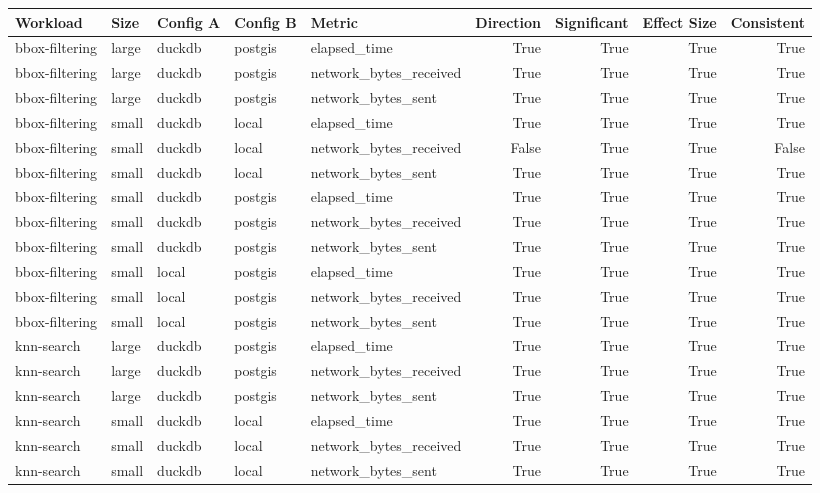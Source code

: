 \begin{tabular}{lllllrrrr}
\toprule
Workload & Size & Config A & Config B & Metric & Direction & Significant & Effect Size & Consistent \\
\midrule
bbox-filtering & large & duckdb & postgis & elapsed\_time & True & True & True & True \\
bbox-filtering & large & duckdb & postgis & network\_bytes\_received & True & True & True & True \\
bbox-filtering & large & duckdb & postgis & network\_bytes\_sent & True & True & True & True \\
bbox-filtering & small & duckdb & local & elapsed\_time & True & True & True & True \\
bbox-filtering & small & duckdb & local & network\_bytes\_received & False & True & True & False \\
bbox-filtering & small & duckdb & local & network\_bytes\_sent & True & True & True & True \\
bbox-filtering & small & duckdb & postgis & elapsed\_time & True & True & True & True \\
bbox-filtering & small & duckdb & postgis & network\_bytes\_received & True & True & True & True \\
bbox-filtering & small & duckdb & postgis & network\_bytes\_sent & True & True & True & True \\
bbox-filtering & small & local & postgis & elapsed\_time & True & True & True & True \\
bbox-filtering & small & local & postgis & network\_bytes\_received & True & True & True & True \\
bbox-filtering & small & local & postgis & network\_bytes\_sent & True & True & True & True \\
knn-search & large & duckdb & postgis & elapsed\_time & True & True & True & True \\
knn-search & large & duckdb & postgis & network\_bytes\_received & True & True & True & True \\
knn-search & large & duckdb & postgis & network\_bytes\_sent & True & True & True & True \\
knn-search & small & duckdb & local & elapsed\_time & True & True & True & True \\
knn-search & small & duckdb & local & network\_bytes\_received & True & True & True & True \\
knn-search & small & duckdb & local & network\_bytes\_sent & True & True & True & True \\

\end{tabular}
